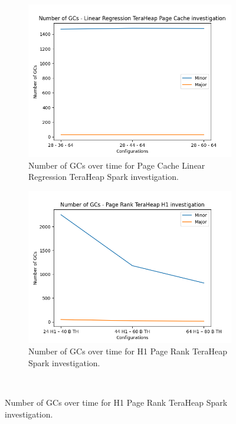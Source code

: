 \begin{figure}[htbp]
    \begin{subfigure}[b]{0.48\textwidth}
    \includegraphics[width=\linewidth]{./fig/gcs_linr_pc_th.png}
    \caption{Number of GCs over time for Page Cache Linear Regression
    TeraHeap Spark investigation.}
    \label{fig:gcs_linr_pc_th}  
    \end{subfigure}

    \begin{subfigure}[b]{0.48\textwidth}
    \includegraphics[width=\linewidth]{./fig/gcs_pr_h1_th.png}
    \caption{Number of GCs over time for H1 Page Rank TeraHeap Spark
    investigation.}
    \label{fig:gcs_pr_h1_th}
    \end{subfigure}\\[1em]
\end{figure}


